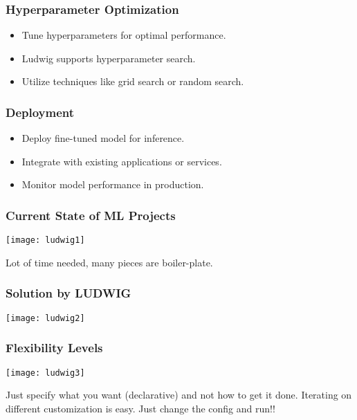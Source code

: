 \begin{frame}[fragile]\frametitle{Hyperparameter Optimization}
    \begin{itemize}
        \item Tune hyperparameters for optimal performance.
        \item Ludwig supports hyperparameter search.
        \item Utilize techniques like grid search or random search.
    \end{itemize}
\end{frame}

\begin{frame}[fragile]\frametitle{Deployment}
    \begin{itemize}
        \item Deploy fine-tuned model for inference.
        \item Integrate with existing applications or services.
        \item Monitor model performance in production.
    \end{itemize}
\end{frame}


\begin{frame}[fragile]\frametitle{Current State of ML Projects}


		\begin{center}
		\texttt{[image: ludwig1]}
		\end{center}

Lot of time needed, many pieces are boiler-plate.
\end{frame}


\begin{frame}[fragile]\frametitle{Solution by LUDWIG}


		\begin{center}
		\texttt{[image: ludwig2]}
		\end{center}

\end{frame}

\begin{frame}[fragile]\frametitle{Flexibility Levels}


		\begin{center}
		\texttt{[image: ludwig3]}
		\end{center}

Just specify what you want (declarative) and not how to get it done.
Iterating on different customization is easy. Just change the config and run!!

\end{frame}

